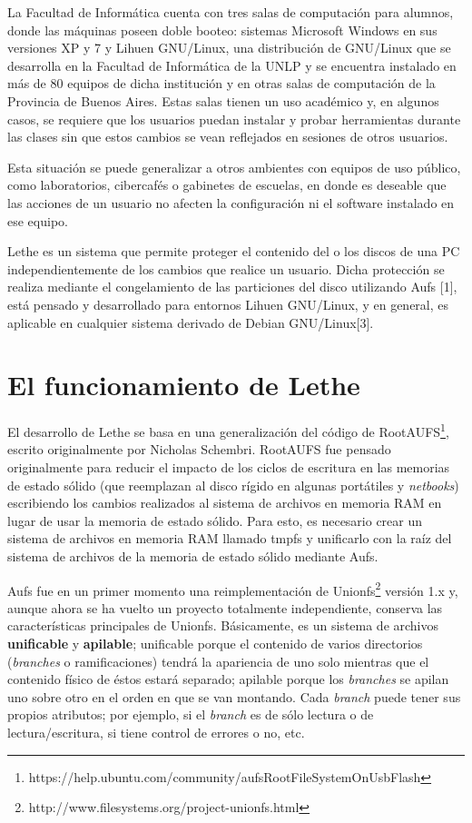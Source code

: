 \documentclass[final,narroweqnarray,inline,twoside]{ieee}
\newcommand{\itref}[1]{[{#1}]}
\begin{document}
La Facultad de Informática cuenta con tres salas de computación para alumnos, donde las máquinas poseen doble booteo:
sistemas Microsoft Windows en sus versiones XP y 7 y Lihuen GNU/Linux, una distribución de GNU/Linux que se desarrolla en la
Facultad de Informática de la UNLP y se encuentra instalado en más de 80 equipos de dicha institución y en otras salas de
computación de la Provincia de Buenos Aires. Estas salas tienen un uso académico y, en algunos casos, se requiere que los
usuarios puedan instalar y probar herramientas durante las clases sin que estos cambios se vean reflejados en sesiones de
otros usuarios.

Esta situación se puede generalizar a otros ambientes con equipos de uso público, como laboratorios, cibercafés o gabinetes
de escuelas, en donde es deseable que las acciones de un usuario no afecten la configuración ni el software instalado en ese
equipo.

Lethe es un sistema que permite proteger el contenido del o los discos de una PC independientemente de los cambios que
realice un usuario. Dicha protección se realiza mediante el congelamiento de las particiones del disco utilizando
Aufs \itref{1}, está pensado y desarrollado para entornos Lihuen GNU/Linux, y en general, es aplicable en cualquier
sistema derivado de Debian GNU/Linux\itref{3}.

\section{El funcionamiento de Lethe}
El desarrollo de Lethe se basa en una generalización del código de RootAUFS\footnote
{https://help.ubuntu.com/community/aufsRootFileSystemOnUsbFlash}, escrito originalmente por Nicholas Schembri. RootAUFS fue
pensado originalmente para reducir el impacto de los ciclos de escritura en las memorias de estado sólido (que reemplazan al
disco rígido en algunas portátiles y \textit{netbooks}) escribiendo los cambios realizados al sistema de archivos en memoria
RAM en lugar de usar la memoria de estado sólido. Para esto, es necesario crear un sistema de archivos en memoria RAM llamado
tmpfs y unificarlo con la raíz del sistema de archivos de la memoria de estado sólido mediante
Aufs.

Aufs fue en un primer momento una reimplementación de Unionfs\footnote{http://www.filesystems.org/project-unionfs.html}
versión 1.x y, aunque ahora se ha vuelto un proyecto totalmente independiente, conserva las características principales de
Unionfs. Básicamente, es un sistema de archivos \textbf{unificable} y \textbf{apilable}; unificable porque el contenido de
varios directorios (\textit{branches} o ramificaciones) tendrá la apariencia de uno solo mientras que el contenido físico de
éstos estará separado; apilable porque los \textit{branches} se apilan uno sobre otro en el orden en que se van montando.
Cada \textit{branch} puede tener sus propios atributos; por ejemplo, si el \textit{branch} es de sólo lectura o de
lectura/escritura, si tiene control de errores o no, etc.
\end{document}

